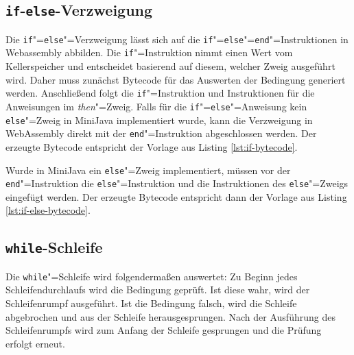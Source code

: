 

\subsection{\lstinline{if}-\lstinline{else}-Verzweigung}
Die \lstinline{if}"=\lstinline{else}"=Verzweigung lässt sich auf die \lstinline{if}"=\lstinline{else}"=\lstinline{end}"=Instruktionen in Webassembly abbilden. Die \lstinline{if}"=Instruktion nimmt einen Wert vom Kellerspeicher und entscheidet basierend auf diesem, welcher Zweig ausgeführt wird. Daher muss zunächst Bytecode für das Auswerten der Bedingung generiert werden. Anschließend folgt die \lstinline{if}"=Instruktion und Instruktionen für die Anweisungen im \emph{then}"=Zweig. Falls für die \lstinline{if}"=\lstinline{else}"=Anweisung kein \lstinline{else}"=Zweig in MiniJava implementiert wurde, kann die Verzweigung in WebAssembly direkt mit der \lstinline{end}"=Instruktion abgeschlossen werden. Der erzeugte Bytecode entspricht der Vorlage aus Listing \ref{lst:if-bytecode}.



Wurde in MiniJava ein \lstinline{else}"=Zweig implementiert, müssen vor der \lstinline{end}"=Instruktion die \lstinline{else}"=Instruktion und die Instruktionen des \lstinline{else}"=Zweigs eingefügt werden. Der erzeugte Bytecode entspricht dann der Vorlage aus Listing \ref{lst:if-else-bytecode}.



\subsection{\lstinline{while}-Schleife}

Die \lstinline{while}"=Schleife wird folgendermaßen auswertet: Zu Beginn jedes Schleifendurchlaufs wird die Bedingung geprüft. Ist diese wahr, wird der Schleifenrumpf ausgeführt. Ist die Bedingung falsch, wird die Schleife abgebrochen und aus der Schleife herausgesprungen. Nach der Ausführung des Schleifenrumpfs wird zum Anfang der Schleife gesprungen und die Prüfung erfolgt erneut.

